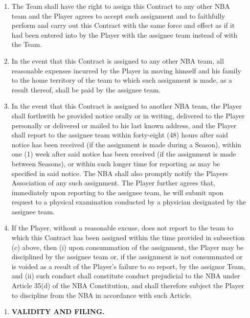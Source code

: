 \documentclass[
]{book}
\providecommand{\tightlist}{%
  \setlength{\itemsep}{0pt}\setlength{\parskip}{0pt}}
\begin{document}
\begin{enumerate}
\def\labelenumi{(\alph{enumi})}
\tightlist
\item
  The Team shall have the right to assign this Contract to any other NBA team and the Player agrees to accept such assignment and to faithfully perform and carry out this Contract with the same force and effect as if it had been entered into by the Player with the assignee team instead of with the Team.
\item
  In the event that this Contract is assigned to any other NBA team, all reasonable expenses incurred by the Player in moving himself and his family to the home territory of the team to which such assignment is made, as a result thereof, shall be paid by the assignee team.
\item
  In the event that this Contract is assigned to another NBA team, the Player shall forthwith be provided notice orally or in writing, delivered to the Player personally or delivered or mailed to his last known address, and the Player shall report to the assignee team within forty-eight (48) hours after said notice has been received (if the assignment is made during a Season), within one (1) week after said notice has been received (if the assignment is made between Seasons), or within such longer time for reporting as may be specified in said notice. The NBA shall also promptly notify the Players Association of any such assignment. The Player further agrees that, immediately upon reporting to the assignee team, he will submit upon request to a physical examination conducted by a physician designated by the assignee team.
\item
  If the Player, without a reasonable excuse, does not report to the team to which this Contract has been assigned within the time provided in subsection (c) above, then (i) upon consummation of the assignment, the Player may be disciplined by the assignee team or, if the assignment is not consummated or is voided as a result of the Player's failure to so report, by the assignor Team, and (ii) such conduct shall constitute conduct prejudicial to the NBA under Article 35(d) of the NBA Constitution, and shall therefore subject the Player to discipline from the NBA in accordance with such Article.
\end{enumerate}

\begin{enumerate}
\def\labelenumi{\arabic{enumi}.}
\setcounter{enumi}{10}
\tightlist
\item
  \textbf{VALIDITY AND FILING.}
\end{enumerate}
\end{document}
